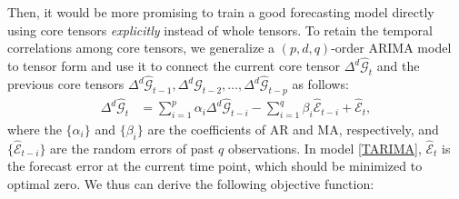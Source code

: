 \documentclass[letterpaper]{article} %
\numberwithin{theorem}{section}
\newcommand{\ten}[1]{ \boldsymbol{\mathcal #1}}
\begin{document}
Then, it would be more promising to train a good forecasting model  directly using   core tensors  \textit{explicitly} instead of whole  tensors. To   retain the temporal correlations  among core tensors, we generalize  a $(p,d,q)$-order  ARIMA model to tensor form and use it to   connect  the current core tensor ${ \Delta^d  \widehat{\ten{G}}_t} $ and the previous core tensors
${\Delta^d  \widehat{\ten{G}}_{t-1}},\Delta^d  {\widehat{\ten{G}}_{t-2}}, \ldots, \Delta^d  {\widehat{\ten{G}}_{t-p}}$ as follows:
\begin{equation} \label{TARIMA}
\begin{aligned}
\Delta^d  {\widehat{\ten{G}}_{t}}    & =  \sum_{i=1}^{p} \alpha_i  {\Delta^d   \widehat{\ten{G}}_{t-i}}  - \sum_{i=1}^{q} \beta_i {\widehat{\ten{E}}_{t-i}} + \widehat{\ten{E}}_t,
\end{aligned}
\end{equation}
where the  $\{\alpha_i \}$ and  $\{\beta_i\}$  are the coefficients of AR and MA, respectively, and $\{\widehat{\ten{E}}_{t-i}\}$ are the random errors of past $q$ observations.  In model \eqref{TARIMA}, $\widehat{\ten{E}}_t$ is the forecast error at the current time point, which should be minimized  to optimal  zero. We  thus can derive the following  objective function:
\end{document}
